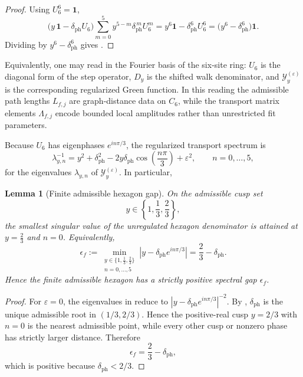 \documentclass[11pt,a4paper]{article}
\newtheorem{lemma}[theorem]{Lemma}
\theoremstyle{definition}
\theoremstyle{remark}
\begin{document}
\begin{proof}
Using $U_6^6=\mathbf 1$,
\[
\bigl(y\,\mathbf 1-\delta_{\mathrm{ph}}U_6\bigr)
\sum_{m=0}^{5}y^{5-m}\delta_{\mathrm{ph}}^{\,m}U_6^m
=
y^6\mathbf 1-\delta_{\mathrm{ph}}^6U_6^6
=
\bigl(y^6-\delta_{\mathrm{ph}}^6\bigr)\mathbf 1.
\]
Dividing by $y^6-\delta_{\mathrm{ph}}^6$ gives .
\end{proof}

Equivalently, one may read  in the Fourier basis of the six-site ring: $U_6$ is the diagonal form of the step operator, $D_y$ is the shifted walk denominator, and $\mathcal Y_y^{(\varepsilon)}$ is the corresponding regularized Green function. In this reading the admissible path lengths $L_{f,j}$ are graph-distance data on $C_6$, while the transport matrix elements $\Lambda_{f,j}$ encode bounded local amplitudes rather than unrestricted fit parameters.

Because $U_6$ has eigenphases $e^{in\pi/3}$, the regularized transport spectrum is
\begin{equation}
\label{eq:transport-spectrum}
\lambda_{y,n}^{-1}
=
y^2+\delta_{\mathrm{ph}}^2-2y\delta_{\mathrm{ph}}\cos\!\left(\frac{n\pi}{3}\right)+\varepsilon^2,
\qquad
n=0,\dots,5,
\end{equation}
for the eigenvalues $\lambda_{y,n}$ of $\mathcal Y_y^{(\varepsilon)}$. In particular,
\begin{lemma}[Finite admissible hexagon gap]
\label{lem:finite-admissible-hexagon-gap}
On the admissible cusp set
\[
y\in\left\{1,\frac13,\frac23\right\},
\]
the smallest singular value of the unregulated hexagon denominator is attained at $y=\frac23$ and $n=0$. Equivalently,
\[
\epsilon_f
:=
\min_{\substack{y\in\{1,\frac13,\frac23\}\\ n=0,\dots,5}}
\left|y-\delta_{\mathrm{ph}}e^{in\pi/3}\right|
=
\frac23-\delta_{\mathrm{ph}}.
\]
Hence the finite admissible hexagon has a strictly positive spectral gap $\epsilon_f$.
\end{lemma}

\begin{proof}
For $\varepsilon=0$, the eigenvalues in  reduce to
$|y-\delta_{\mathrm{ph}}e^{in\pi/3}|^{-2}$. By ,
$\delta_{\mathrm{ph}}$ is the unique admissible root in $(1/3,2/3)$. Hence the positive-real cusp
$y=2/3$ with $n=0$ is the nearest admissible point, while every other cusp or nonzero phase has
strictly larger distance. Therefore
\[
\epsilon_f=\frac23-\delta_{\mathrm{ph}},
\]
which is positive because $\delta_{\mathrm{ph}}<2/3$.
\end{proof}
\end{document}
